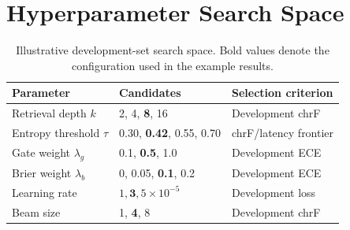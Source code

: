 \section{Hyperparameter Search Space}
\label{app:hyperparameters}

\begin{table}[h]
  \centering
  \caption{Illustrative development-set search space. Bold values denote the
  configuration used in the example results.}
  \small
  \begin{tabular}{lll}
    \toprule
    Parameter & Candidates & Selection criterion \\
    \midrule
    Retrieval depth $k$ & 2, 4, \textbf{8}, 16 & Development chrF \\
    Entropy threshold $\tau$ & 0.30, \textbf{0.42}, 0.55, 0.70 & chrF/latency frontier \\
    Gate weight $\lambda_g$ & 0.1, \textbf{0.5}, 1.0 & Development ECE \\
    Brier weight $\lambda_b$ & 0, 0.05, \textbf{0.1}, 0.2 & Development ECE \\
    Learning rate & $1,\mathbf{3},5\times10^{-5}$ & Development loss \\
    Beam size & 1, \textbf{4}, 8 & Development chrF \\
    \bottomrule
  \end{tabular}
\end{table}
